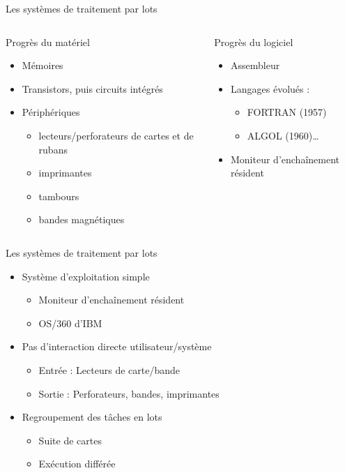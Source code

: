 \begin{frame}{Les systèmes de traitement par lots}
\begin{columns}
\begin{block}{Progrès du matériel}
\begin{itemize}
\item Mémoires
\item Transistors, puis circuits intégrés
\item Périphériques
\begin{itemize}
\item lecteurs/perforateurs de cartes et de rubans
\item imprimantes
\item tambours
\item bandes magnétiques
\end{itemize}
\end{itemize}
\end{block}
\begin{block}{Progrès du logiciel}
\begin{itemize}
\item Assembleur
\item Langages évolués :
\begin{itemize}
\item FORTRAN (1957)
\item ALGOL (1960)…
\end{itemize}
\item Moniteur d’enchaînement résident
\end{itemize}
\end{block}
\end{columns}
\end{frame}

\begin{frame}{Les systèmes de traitement par lots}
\begin{itemize}
\item Système d'exploitation simple
\begin{itemize}
\item Moniteur d’enchaînement résident
\item OS/360 d’IBM
\end{itemize}
\item Pas d'interaction directe utilisateur/système
\begin{itemize}
\item Entrée : Lecteurs de carte/bande
\item Sortie : Perforateurs, bandes, imprimantes
\end{itemize}
\item Regroupement des tâches en lots
\begin{itemize}
\item Suite de cartes
\item Exécution différée
\end{itemize}
\end{itemize}
\end{frame}

